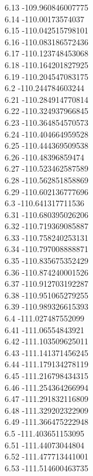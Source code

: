 {6.13	-109.960846007775\\
6.14	-110.00173574037\\
6.15	-110.042515798101\\
6.16	-110.083186572436\\
6.17	-110.123748453068\\
6.18	-110.164201827925\\
6.19	-110.204547083175\\
6.2	-110.244784603244\\
6.21	-110.284914770814\\
6.22	-110.324937966845\\
6.23	-110.364854570573\\
6.24	-110.404664959528\\
6.25	-110.444369509538\\
6.26	-110.48396859474\\
6.27	-110.523462587589\\
6.28	-110.562851858869\\
6.29	-110.602136777696\\
6.3	-110.641317711536\\
6.31	-110.680395026206\\
6.32	-110.719369085887\\
6.33	-110.758240253131\\
6.34	-110.797008888871\\
6.35	-110.835675352429\\
6.36	-110.874240001526\\
6.37	-110.912703192287\\
6.38	-110.951065279255\\
6.39	-110.989326615393\\
6.4	-111.027487552099\\
6.41	-111.06554843921\\
6.42	-111.103509625011\\
6.43	-111.141371456245\\
6.44	-111.179134278119\\
6.45	-111.216798434315\\
6.46	-111.254364266994\\
6.47	-111.291832116809\\
6.48	-111.329202322909\\
6.49	-111.366475222948\\
6.5	-111.403651153095\\
6.51	-111.44073044804\\
6.52	-111.477713441001\\
6.53	-111.514600463735\\
}
